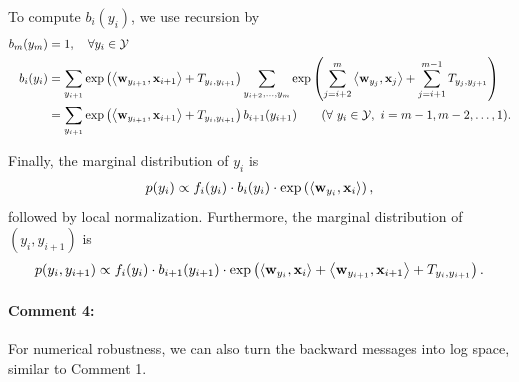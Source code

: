 \documentclass[11pt]{report}
\begin{document}
	
	To compute $b_i(y_i)$, we use recursion by
	\begin{align}
		\label{eq:rec_Z_forward_1}
		b_m(y_m) &= 1, \quad \forall y_i \in \mathcal{Y} \\
		b_i(y_i) &= \sum_{y_{i+1}} \exp \left(\left\langle \mathbf{\boldsymbol{w}}_{y_{i+1}},\mathbf{\boldsymbol{x}}_{i+1} \right\rangle + T_{y_{i}, y_{i+1}}\right)
		\sum_{y_{i+2}, \ldots, y_m} \exp \left(\sum_{j=i+2}^{m} \left\langle \mathbf{\boldsymbol{w}}_{y_j},\mathbf{\boldsymbol{x}}_j \right\rangle + \sum_{j=i+1}^{m-1} T_{y_j, y_{j+1}}\right) \\
		\label{eq:rec_Z_forward_2}
		&= \sum_{y_{i+1}}\exp \left(\left\langle \mathbf{\boldsymbol{w}}_{y_{i+1}},\mathbf{\boldsymbol{x}}_{i+1} \right\rangle + T_{y_{i}, y_{i+1}}\right) b_{i+1}(y_{i+1})  \qquad (\forall\ y_i \in \mathcal{Y}, \ i = m-1, m-2, \ldots, 1).	 
	\end{align}
	
	Finally, the marginal distribution of $y_i$ is
	\begin{align}
		p(y_i) \propto f_i(y_i) \cdot b_i(y_i) \cdot \exp \left(\left\langle \mathbf{\boldsymbol{w}}_{y_{i}},\mathbf{\boldsymbol{x}}_{i} \right\rangle\right),
	\end{align}
	followed by local normalization.
	Furthermore, the marginal distribution of $(y_i, y_{i+1})$ is
	\begin{align}
		p(y_i, y_{i+1}) \propto f_i(y_i) \cdot b_{i+1}(y_{i+1}) \cdot 
		\exp \left(\left\langle \mathbf{\boldsymbol{w}}_{y_{i}},\mathbf{\boldsymbol{x}}_{i} \right\rangle + \left\langle \mathbf{\boldsymbol{w}}_{y_{i+1}},\mathbf{\boldsymbol{x}}_{i+1} \right\rangle + T_{y_i, y_{i+1}}\right).
	\end{align}
	
	\paragraph{Comment 4:}
	For numerical robustness,
	we can also turn the backward messages into log space, similar to Comment 1.
	
	
	
	
\end{document}
